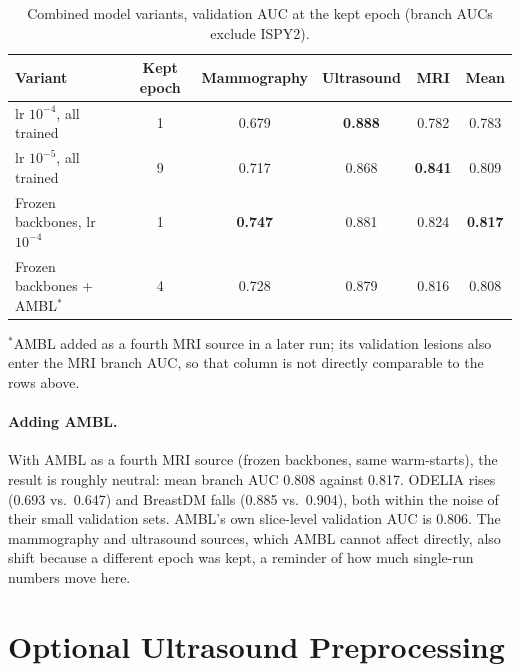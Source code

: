 \documentclass[11pt]{article}
\begin{document}
\begin{table}[htbp]
  \centering
  \caption{Combined model variants, validation AUC at the kept epoch (branch AUCs exclude ISPY2).}
  \label{tab:phase2-variants}
  \begin{tabular}{@{}l c c c c c@{}}
    \toprule
    Variant & Kept epoch & Mammography & Ultrasound & MRI & Mean \\
    \midrule
    lr $10^{-4}$, all trained & 1 & 0.679 & \textbf{0.888} & 0.782 & 0.783 \\
    lr $10^{-5}$, all trained & 9 & 0.717 & 0.868 & \textbf{0.841} & 0.809 \\
    Frozen backbones, lr $10^{-4}$ & 1 & \textbf{0.747} & 0.881 & 0.824 & \textbf{0.817} \\
    Frozen backbones + AMBL$^{*}$ & 4 & 0.728 & 0.879 & 0.816 & 0.808 \\
    \bottomrule
  \end{tabular}
  \par\smallskip\footnotesize
  $^{*}$AMBL added as a fourth MRI source in a later run; its validation lesions also enter the MRI branch AUC, so that column is not directly comparable to the rows above.
\end{table}

\paragraph{Adding AMBL.} With AMBL as a fourth MRI source (frozen backbones,
same warm-starts), the result is roughly neutral: mean branch AUC 0.808
against 0.817. ODELIA rises (0.693 vs.\ 0.647) and BreastDM falls (0.885 vs.\
0.904), both within the noise of their small validation sets. AMBL's own
slice-level validation AUC is 0.806. The mammography and ultrasound sources,
which AMBL cannot affect directly, also shift because a different epoch was
kept, a reminder of how much single-run numbers move here.

\section{Optional Ultrasound Preprocessing}
\label{sec:us-preprocessing}
\end{document}
